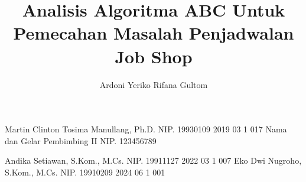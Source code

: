 \documentclass[article]{report} %
\begin{document}

    
    \title{Analisis Algoritma ABC Untuk Pemecahan Masalah Penjadwalan Job Shop} %
    
    \author{Ardoni Yeriko Rifana Gultom}		%
	
	\dosbingA%
		{Martin Clinton Tosima Manullang, Ph.D.}%
		{NIP. 19930109 2019 03 1 017}				%
	\dosbingB%
		{Nama dan Gelar Pembimbing II}%
		{NIP. 123456789}				%
		
	\pengujiA%
		{Andika Setiawan, S.Kom., M.Cs.}%
		{NIP. 19911127 2022 03 1 007}				%
	\pengujiB%
		{Eko Dwi Nugroho, S.Kom., M.Cs.}%
		{NIP. 19910209 2024 06 1 001}				%

	\sloppy %
    \setcounter{page}{1} %

    \clearpage
    \pagestyle{alternatingstyle}
    
%    
%   

    \tableofcontents
    \pagebreak
    \listoftables
    \pagebreak
    \listoffigures
    \pagebreak
    \listofmyequations
%    
    \lstlistoflistings
    \pagebreak
    
\end{document}
